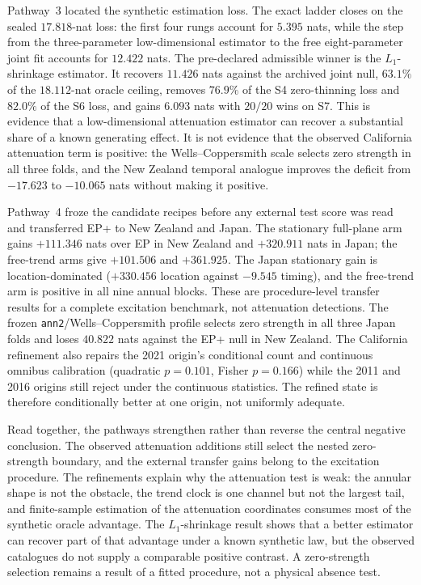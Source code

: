 Pathway~3 located the synthetic estimation loss. The exact ladder closes on the sealed $17.818$-nat loss: the first four rungs account for $5.395$ nats, while the step from the three-parameter low-dimensional estimator to the free eight-parameter joint fit accounts for $12.422$ nats. The pre-declared admissible winner is the $L_1$-shrinkage estimator. It recovers $11.426$ nats against the archived joint null, $63.1\%$ of the $18.112$-nat oracle ceiling, removes $76.9\%$ of the S4 zero-thinning loss and $82.0\%$ of the S6 loss, and gains $6.093$ nats with $20/20$ wins on S7. This is evidence that a low-dimensional attenuation estimator can recover a substantial share of a known generating effect. It is not evidence that the observed California attenuation term is positive: the Wells--Coppersmith scale selects zero strength in all three folds, and the New Zealand temporal analogue improves the deficit from $-17.623$ to $-10.065$ nats without making it positive.

Pathway~4 froze the candidate recipes before any external test score was read and transferred EP+ to New Zealand and Japan. The stationary full-plane arm gains $+111.346$ nats over EP in New Zealand and $+320.911$ nats in Japan; the free-trend arms give $+101.506$ and $+361.925$. The Japan stationary gain is location-dominated ($+330.456$ location against $-9.545$ timing), and the free-trend arm is positive in all nine annual blocks. These are procedure-level transfer results for a complete excitation benchmark, not attenuation detections. The frozen \texttt{ann2}/Wells--Coppersmith profile selects zero strength in all three Japan folds and loses $40.822$ nats against the EP+ null in New Zealand. The California refinement also repairs the 2021 origin's conditional count and continuous omnibus calibration (quadratic $p=0.101$, Fisher $p=0.166$) while the 2011 and 2016 origins still reject under the continuous statistics. The refined state is therefore conditionally better at one origin, not uniformly adequate.

Read together, the pathways strengthen rather than reverse the central negative conclusion. The observed attenuation additions still select the nested zero-strength boundary, and the external transfer gains belong to the excitation procedure. The refinements explain why the attenuation test is weak: the annular shape is not the obstacle, the trend clock is one channel but not the largest tail, and finite-sample estimation of the attenuation coordinates consumes most of the synthetic oracle advantage. The $L_1$-shrinkage result shows that a better estimator can recover part of that advantage under a known synthetic law, but the observed catalogues do not supply a comparable positive contrast. A zero-strength selection remains a result of a fitted procedure, not a physical absence test.

